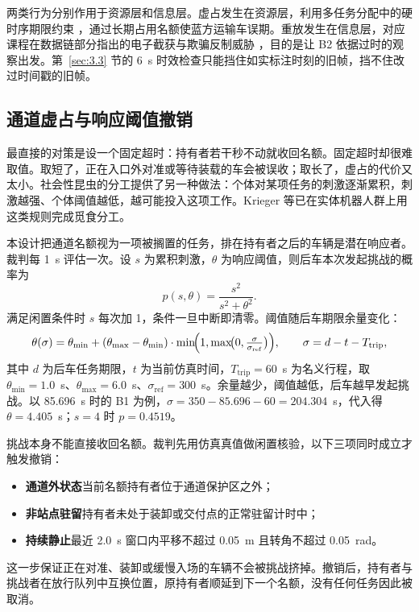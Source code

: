 两类行为分别作用于资源层和信息层。虚占发生在资源层，利用多任务分配中的硬时序期限约束 \cite{ref3}，通过长期占用名额使蓝方运输车误期。重放发生在信息层，对应课程在数据链部分指出的电子截获与欺骗反制威胁 \cite{ref1}，目的是让 B2 依据过时的观察出发。第~\ref{sec:3.3} 节的 6~s 时效检查只能挡住如实标注时刻的旧帧，挡不住改过时间戳的旧帧。

\subsection{通道虚占与响应阈值撤销}\label{sec:adv.2}

最直接的对策是设一个固定超时：持有者若干秒不动就收回名额。固定超时却很难取值。取短了，正在入口外对准或等待装载的车会被误收；取长了，虚占的代价又太小。社会性昆虫的分工提供了另一种做法：个体对某项任务的刺激逐渐累积，刺激越强、个体阈值越低，越可能投入这项工作\cite{ref8}。Krieger 等已在实体机器人群上用这类规则完成觅食分工\cite{ref16}。

本设计把通道名额视为一项被搁置的任务，排在持有者之后的车辆是潜在响应者。裁判每 1~s 评估一次。设 $s$ 为累积刺激，$\theta$ 为响应阈值，则后车本次发起挑战的概率为
\begin{equation}
p(s,\theta)=\frac{s^{2}}{s^{2}+\theta^{2}}.\label{eq:threshold}
\end{equation}
满足闲置条件时 $s$ 每次加 1，条件一旦中断即清零。阈值随后车期限余量变化：
\begin{equation}
\theta(\sigma)=\theta_{\min}+(\theta_{\max}-\theta_{\min})\cdot\min\!\Bigl(1,\max\!\bigl(0,\tfrac{\sigma}{\sigma_{\mathrm{ref}}}\bigr)\Bigr),\qquad \sigma=d-t-T_{\mathrm{trip}},\label{eq:theta}
\end{equation}
其中 $d$ 为后车任务期限，$t$ 为当前仿真时间，$T_{\mathrm{trip}}=60$~s 为名义行程，取 $\theta_{\min}=1.0$~s、$\theta_{\max}=6.0$~s、$\sigma_{\mathrm{ref}}=300$~s。余量越少，阈值越低，后车越早发起挑战。以 85.696~s 时的 B1 为例，$\sigma=350-85.696-60=204.304$~s，代入得 $\theta=4.405$~s；$s=4$ 时 $p=0.4519$。

挑战本身不能直接收回名额。裁判先用仿真真值做闲置核验，以下三项同时成立才触发撤销：
\begin{itemize}
\item \textbf{通道外状态}\quad 当前名额持有者位于通道保护区之外；
\item \textbf{非站点驻留}\quad 持有者未处于装卸或交付点的正常驻留计时中；
\item \textbf{持续静止}\quad 最近 2.0~s 窗口内平移不超过 0.05~m 且转角不超过 0.05~rad。
\end{itemize}
这一步保证正在对准、装卸或缓慢入场的车辆不会被挑战挤掉。撤销后，持有者与挑战者在放行队列中互换位置，原持有者顺延到下一个名额，没有任何任务因此被取消。

